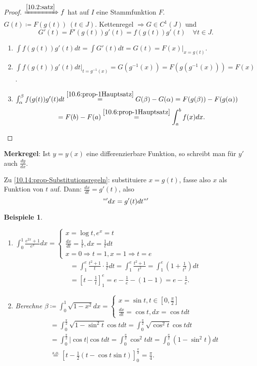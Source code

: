 \documentclass[14pt,titlepage,ngerman,a4paper,headsepline,DIV15,halfparskip*]{scrartcl}
\theoremstyle{named}
\theoremstyle{dotless}
\newtheorem*{beispiele}{Beispiele}
\begin{document}
\begin{proof}
	$\xRightarrow[]{\ref{10.2:satz}} f$ hat auf $I$ eine Stammfunktion $F$. $G(t) \coloneqq F(g(t)) ~ (t \in J)$. Kettenregel $\Rightarrow G \in C^{1}(J)$ und
	$$ G'(t) = F'(g(t)) g'(t) = f(g(t)) g'(t) \quad \forall t \in J. $$
	\begin{enumerate}
		\item $\int f(g(t)) g'(t) dt = \int G'(t) dt = G(t) = F(x) \Big|_{x=g(t)}$.
		\item $\int f(g(t)) g'(t) dt\Big|_{t = g^{-1}(x)} = G(g^{-1}(x)) = F(g(g^{-1}(x))) = F(x)$.
		\item $\int_{\alpha}^{\beta} f(g(t)) g'(t) dt \overset{\ref{10.6:prop-1Hauptsatz}}{=} G(\beta) - G(\alpha) = F(g(\beta)) - F(g(\alpha))$ 
		$$ = F(b) - F(a) \overset{\ref{10.6:prop-1Hauptsatz}}{=} \int_{a}^{b} f(x) dx. $$ 
	\end{enumerate}
\end{proof}


\textbf{Merkregel}:  Ist $y = y(x)$ eine differenzierbare Funktion, so schreibt man für $y'$ auch $\frac{dy}{dx}$.

Zu \ref{10.14:prop-Substitutionsregeln}: substituiere $x = g(t)$, fasse also $x$ als Funktion von $t$ auf. Dann: $\frac{dx}{dt} = g'(t)$, also
	$$ "' dx = g'(t) dt "' $$


\begin{beispiele} ~\
	\begin{enumerate}
		\item $\int_{0}^{1} \frac{e^{2x} + 1}{e^{x}} dx = \begin{cases} x = \log t, e^{x} = t \\ \frac{dx}{dt} = \frac{1}{t}, dx = \frac{1}{t} dt \\ x = 0 \Rightarrow t = 1, x = 1 \Rightarrow t = e \end{cases} $
			\begin{align*}
				& = \int_{1}^{e} \frac{t^{2} + 1}{t} \cdot \frac{1}{t} dt = \int_{1}^{e} \frac{t^{2} + 1}{t^{2}} = \int_{1}^{e} (1 + \frac{1}{t^{2}}) dt \\
				& = \left[ t - \frac{1}{t} \right]_{1}^{e} = e - \frac{1}{e} - (1 - 1) = e - \frac{
				1}{e}.
			\end{align*}
		\item Berechne $\beta \coloneqq \int_{0}^{1} \sqrt{1 - x^{2}} dx = \begin{cases} x = \sin t, t \in [0, \frac{\pi}{2}] \\ \frac{dx}{dt} = \cos t, dx = \cos t dt \end{cases}$
			\begin{align*}
				& = \int_{0}^{\frac{\pi}{2}} \sqrt{1 - \sin^{2}t} \cos t dt = \int_{0}^{\frac{\pi}{2}} \sqrt{\cos^{2} t} \cos t dt \\
				& = \int_{0}^{\frac{\pi}{2}} |\cos t| \cos t dt = \int_{0}^{\frac{\pi}{2}} \cos^{2} t dt = \int_{0}^{\frac{\pi}{2}} (1 - \sin^{2} t) dt \\
				& \overset{s.o.}{=} \left[ t - \frac{1}{2} (t - \cos t \sin t) \right]_{0}^{\frac{\pi}{2}} = \frac{\pi}{4}.
			\end{align*}
	\end{enumerate}
\end{beispiele}
\end{document}

